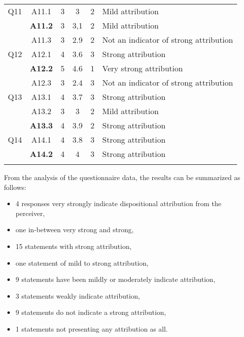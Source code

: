 \begin{longtable}{  c | c  | c | c | c |  p{} }
        \hline
        Q11
        & A11.1
                    & 3 & 3  & 2 & Mild attribution   \\
        & \textbf{A11.2}
                       & 3  & 3,1  & 2 & Mild attribution \\
        & A11.3
                      & 3 & 2.9  & 2 & Not an indicator of strong attribution  \\
        \hline
        Q12
        & A12.1
                    & 4 & 3.6  & 3 & Strong attribution   \\
        & \textbf{A12.2}
                       & 5 & 4.6 & 1 & Very strong attribution \\
        & A12.3
                      & 3 & 2.4  & 3 & Not an indicator of strong attribution  \\
       \hline
        Q13
        & A13.1
                    & 4 & 3.7  & 3 & Strong attribution \\
        & A13.2
                       & 3 & 3 & 2 & Mild attribution \\
        & \textbf{A13.3}
                      & 4 & 3.9  & 2 & Strong attribution   \\
        \hline
        Q14
        & A14.1
                    & 4 & 3.8  & 3 & Strong attribution \\
        & \textbf{A14.2}
                       & 4 & 4 & 3 & Strong attribution \\
        \bottomrule
   \label{QuestionnaireResponsesInterpretation}
\end{longtable}

From the analysis of the questionnaire data, the results can be summarized as follows:

\begin{itemize}
\item 4 responses very strongly indicate dispositional attribution from the perceiver,
\item one in-between very strong and strong,
\item 15 statements with strong attribution,
\item one statement of mild to strong attribution,
\item 9 statements have been mildly or moderately indicate attribution,
\item 3 statements weakly indicate attribution,
\item 9 statements do not indicate a strong attribution,
\item 1 statements not presenting any attribution as all.
\end{itemize} 

